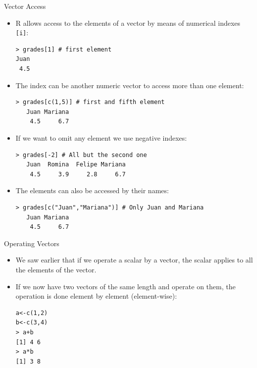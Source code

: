 \documentclass[handout]{beamer}
\begin{document}
\begin{frame}[fragile]{Vector Access}
\scriptsize{
\begin{itemize}

 \item R allows access to the elements of a vector by means of numerical indexes \verb+[i]+: 
\begin{verbatim}
> grades[1] # first element
Juan 
 4.5
\end{verbatim}

\item The index can be another numeric vector to access more than one element:
\begin{verbatim}
> grades[c(1,5)] # first and fifth element
   Juan Mariana 
    4.5     6.7 
\end{verbatim}

\item If we want to omit any element we use negative indexes:
\begin{verbatim}
> grades[-2] # All but the second one
   Juan  Romina  Felipe Mariana 
    4.5     3.9     2.8     6.7 
\end{verbatim}

\item The elements can also be accessed by their names:
\begin{verbatim}
> grades[c("Juan","Mariana")] # Only Juan and Mariana
   Juan Mariana 
    4.5     6.7 
\end{verbatim}



\end{itemize}

 

 }
\end{frame}


\begin{frame}[fragile]{Operating Vectors}
\scriptsize{
\begin{itemize}
 \item We saw earlier that if we operate a scalar by a vector, the scalar applies to all the elements of the vector.
 \item If we now have two vectors of the same length and operate on them, the operation is done element by element (element-wise):
\begin{verbatim}
a<-c(1,2)
b<-c(3,4)
> a+b
[1] 4 6
> a*b
[1] 3 8
\end{verbatim}

\end{itemize}
 }
\end{frame}
\end{document}
